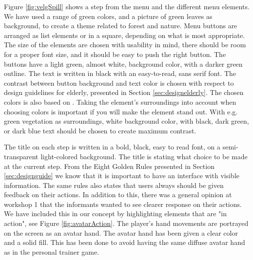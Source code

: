 Figure \ref{fig:velgSpill} shows a step from the menu and the different menu elements. We have used a range of green colors, and a picture of green leaves as background, to create a theme related to forest and nature. Menu buttons are arranged as list elements or in a square, depending on what is most appropriate. The size of the elements are chosen with usability in mind, there should be room for a proper font size, and it should be easy to push the right button. The buttons have a light green, almost white, background color, with a darker green outline. The text is written in black with an easy-to-read, sans serif font. The contrast between button background and text color is chosen with respect to design guidelines for elderly, presented in Section \ref{sec:designelderly}. The chosen colors is also based on \cite{blindeforbundetTekst}. Taking the element's surroundings into account when choosing colors is important if you will make the element stand out. With e.g. green vegetation as surroundings, white background color, with black, dark green, or dark blue text should be chosen to create maximum contrast.   

The title on each step is written in a bold, black, easy to read font, on a semi-transparent light-colored background. The title is stating what choice to be made at the current step. From the Eight Golden Rules presented in Section \ref{sec:designguide} we know that it is important to have an interface with visible information. The same rules also states that users always should be given feedback on their actions. In addition to this, there was a general opinion at workshop 1 that the informants wanted to see clearer response on their actions. We have included this in our concept by highlighting elements that are "in action", see Figure \ref{fig:avatarAction}. The player's hand movements are portrayed on the screen as an avatar hand. The avatar hand has been given a clear color and a solid fill. This has been done to avoid having the same diffuse avatar hand as in the personal trainer game.  

